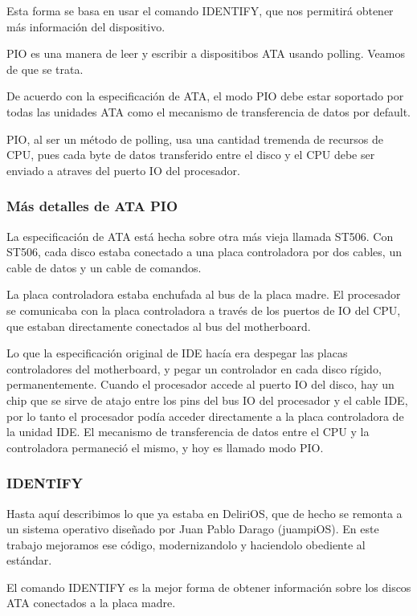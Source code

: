 Esta forma se basa en usar el comando IDENTIFY, que nos permitirá obtener más información del dispositivo.


PIO es una manera de leer y escribir a dispositibos ATA usando polling. Veamos de que se trata.

De acuerdo con la especificación de ATA, el modo PIO debe estar soportado por todas las unidades ATA como el mecanismo de transferencia de datos por default.

PIO, al ser un método de polling, usa una cantidad tremenda de recursos de CPU, pues cada byte de datos transferido entre el disco y el CPU debe ser enviado a atraves del puerto IO del procesador. 

\subsubsection{Más detalles de ATA PIO}

La especificación de ATA está hecha sobre otra más vieja llamada ST506. Con ST506, cada disco estaba conectado a una placa controladora por dos cables, un cable de datos y un cable de comandos.

La placa controladora estaba enchufada al bus de la placa madre. El procesador se comunicaba con la placa controladora a través de los puertos de IO del CPU, que estaban directamente conectados al bus del motherboard.

Lo que la especificación original de IDE hacía era despegar las placas controladores del motherboard, y pegar un controlador en cada disco rígido, permanentemente. Cuando el procesador accede al puerto IO del disco, hay un chip que se sirve de atajo entre los pins del bus IO del procesador y el cable IDE, por lo tanto el procesador podía acceder directamente a la placa controladora de la unidad IDE. El mecanismo de transferencia de datos entre el CPU y la controladora permaneció el mismo, y hoy es llamado modo PIO. 

\subsubsection{IDENTIFY}

Hasta aquí describimos lo que ya estaba en DeliriOS, que de hecho se remonta a un sistema operativo diseñado por Juan Pablo Darago (juampiOS). En este trabajo mejoramos ese código, modernizandolo y haciendolo obediente al estándar.

El comando IDENTIFY es la mejor forma de obtener información sobre los discos ATA conectados a la placa madre.

